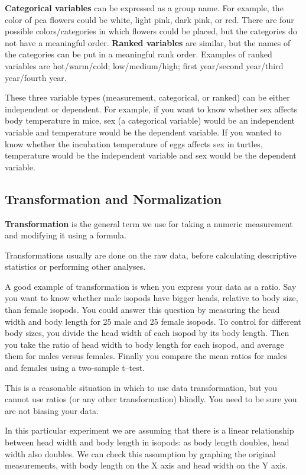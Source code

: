 \documentclass[
]{book}
\begin{document}
\textbf{Categorical variables} can be expressed as a group name. For example, the color of pea flowers could be white, light pink, dark pink, or red. There are four possible colors/categories in which flowers could be placed, but the categories do not have a meaningful order. \textbf{Ranked variables} are similar, but the names of the categories can be put in a meaningful rank order. Examples of ranked variables are hot/warm/cold; low/medium/high; first year/second year/third year/fourth year.

These three variable types (measurement, categorical, or ranked) can be either independent or dependent. For example, if you want to know whether sex affects body temperature in mice, sex (a categorical variable) would be an independent variable and temperature would be the dependent variable. If you wanted to know whether the incubation temperature of eggs affects sex in turtles, temperature would be the independent variable and sex would be the dependent variable.

\hypertarget{transformation-and-normalization}{%
\subsection{Transformation and Normalization}\label{transformation-and-normalization}}

\textbf{Transformation} is the general term we use for taking a numeric measurement and modifying it using a formula.

Transformations usually are done on the raw data, before calculating descriptive statistics or performing other analyses.

A good example of transformation is when you express your data as a ratio. Say you want to know whether male isopods have bigger heads, relative to body size, than female isopods. You could answer this question by measuring the head width and body length for 25 male and 25 female isopods. To control for different body sizes, you divide the head width of each isopod by its body length. Then you take the ratio of head width to body length for each isopod, and average them for males versus females. Finally you compare the mean ratios for males and females using a two-sample t--test.

This is a reasonable situation in which to use data transformation, but you cannot use ratios (or any other transformation) blindly. You need to be sure you are not biasing your data.

In this particular experiment we are assuming that there is a linear relationship between head width and body length in isopods: as body length doubles, head width also doubles. We can check this assumption by graphing the original measurements, with body length on the X axis and head width on the Y axis.
\end{document}
